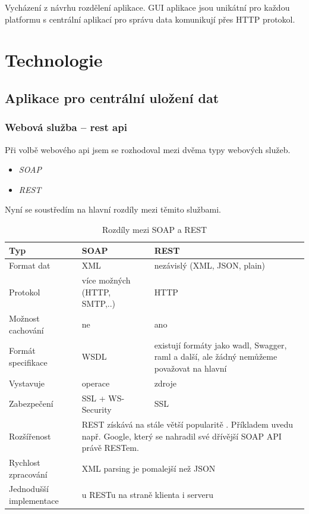 \documentclass[thesis=B,czech]{FITthesis}[2012/06/26]
\begin{document}
Vycházení z návrhu rozdělení aplikace. GUI aplikace jsou unikátní pro každou platformu s centrální aplikací pro správu data komunikují přes HTTP protokol.

\section{Technologie}

\subsection{Aplikace pro centrální uložení dat}
  
\subsubsection{Webová služba -- \acrshort{rest} \acrshort{api}}

Při volbě webového \acrshort{api} jsem se rozhodoval mezi dvěma typy webových služeb.
\newline
\begin{itemize}
	\item \textit{SOAP}
	\item \textit{REST}
\end{itemize}
\vspace*{1\baselineskip}

Nyní se soustředím na hlavní rozdíly mezi těmito službami.

\begin{table}\centering
\caption{Rozdíly mezi SOAP a REST}\label{tab:ws_compare}
\begin{tabular}{|p{3cm}|p{3cm}|p{5.5cm}|}\hline
Typ		& SOAP		& REST \tabularnewline \hline \hline
Format dat\cite{ws_compare_swati}		& XML		& nezávislý (XML, JSON, plain) \tabularnewline \hline
Protokol\cite{ws_compare_swati}		& více možných (HTTP, SMTP,..)		& HTTP \tabularnewline \hline
Možnost cachování\cite{ws_compare_swati}		& ne		& ano \tabularnewline \hline	
Formát specifikace\cite{ws_compare_table}\cite{ws_compare_soapui} & WSDL\cite{ws_soap_wsdl}	& existují formáty jako \acrshort{wadl}\cite{ws_wadl}, Swagger\cite{ws_swagger}, \acrshort{raml}\cite{ws_raml} a další, ale žádný nemůžeme považovat na hlavní \cite{ws_comparison} \tabularnewline \hline 		 
Vystavuje\cite{ws_compare_steve}		& operace & zdroje \tabularnewline \hline
Zabezpečení\cite{ws_compare_steve}		& SSL + WS-Security & SSL \tabularnewline \hline  
Rozšířenost\cite{ws_compare_steve}		& \multicolumn{2}{p{8.5cm}|}{REST získává na stále větší popularitě . Příkladem uvedu např. Google, který se nahradil své dřívější SOAP API právě RESTem.}  \tabularnewline \hline 
Rychlost zpracování\cite{ws_compare_armel} 	& \multicolumn{2}{p{8.5cm}|}{XML parsing je pomalejší než JSON}  \tabularnewline \hline 	 		  		
Jednodušší implementace\cite{ws_compare_swati}		&\multicolumn{2}{p{8.5cm}|}{u RESTu na straně klienta i serveru} \tabularnewline \hline 	 				
\end{tabular}
\end{table}
\end{document}

